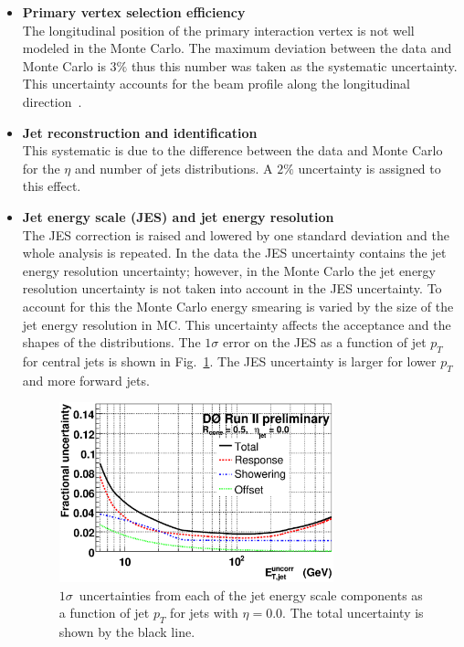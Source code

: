 \begin{itemize}
\item {\bf Primary vertex selection efficiency} \\
The longitudinal position of the primary interaction vertex is not well modeled in the Monte Carlo. The maximum deviation between the data and Monte Carlo is $3\%$ thus this number was taken as the systematic uncertainty. This uncertainty accounts for the beam profile along the longitudinal direction~\cite{beamshifts}.

\item {\bf Jet reconstruction and identification} \\
This systematic is due to the difference between the data and Monte Carlo for the $\eta$ and number of jets distributions. A $2\%$ uncertainty is assigned to this effect.

\item {\bf Jet energy scale (JES) and jet energy resolution} \\
The JES correction is raised and lowered by one standard deviation and
the whole analysis is repeated. In the data the JES uncertainty
contains the jet energy resolution uncertainty; however, in the Monte Carlo
the jet energy resolution uncertainty is not taken into account in the
JES uncertainty. To account for this the Monte Carlo energy smearing
is varied by the size of the jet energy resolution in MC. This
uncertainty affects the acceptance and the shapes of the
distributions. The $1\sigma$ error on the JES as a function of jet $p_{T}$ for central jets is shown in Fig.~\ref{jes2}. The JES uncertainty is larger for lower $p_{T}$ and more forward jets.

\begin{figure}[!h!tbp]
\begin{center}
\includegraphics[width=0.75\textwidth]{eps/Systematics/jes.eps}
\end{center}
\vspace{-0.1in}
\caption{$1\sigma$~uncertainties from each of the jet energy scale components as a function of jet $p_{T}$ for jets with $\eta=0.0$. The total uncertainty is shown by the black line. }
\label{jes2}
\end{figure}


\end{itemize}
